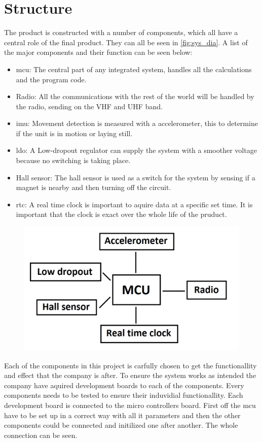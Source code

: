\section{Structure}
The product is constructed with a number of components, which all have a central role of the final product. They can all be seen in \autoref{fig:sys_dia}. A list of the major components and their function can be seen below:

\begin{itemize}[noitemsep] 
\item \gls{mcu}: The central part of any integrated system, handles all the calculations and the program code.
\item Radio: All the communications with the rest of the world will be handled by the radio, sending on the VHF and UHF band.
\item \gls{imu}: Movement detection is measured with a accelerometer, this to determine if the unit is  in motion or laying still. 
\item \gls{ldo}: A Low-dropout regulator can supply the system with a smoother voltage because no switching is taking place.
\item Hall sensor: The hall sensor is used as a switch for the system by sensing if a magnet is nearby and then turning off the circuit.
\item \gls{rtc}: A real time clock is important to aquire data at a specific set time. It is important that the clock is exact over the whole life of the pruduct.
\end{itemize} 


\begin{figure}[H] 
\centering 
\includegraphics[width=.8\linewidth]{Figures/System_diagram} 
\label{fig:sys_dia} 
\end{figure} 

Each of the components in this project is carfully chosen to get the functionallity and effect that the company is after. To ensure the system works as intended the company have aquired development boards to each of the components. Every components needs to be tested to ensure their induvidial functionallity. Each development board is connected to the micro controllers board. First off the \gls{mcu} have to be set up in a correct way with all it parameters and then the other components could be connected and initilized one after another. The whole connection can be seen. %

